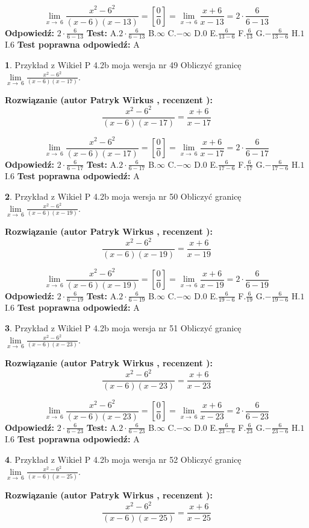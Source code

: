 \documentclass[12pt, a4paper]{article}
\theoremstyle{definition} %
\newtheorem{zad}{}
\newcommand{\zadStart}[1]{\begin{zad}#1\newline}
\newcommand{\zadStop}{\end{zad}}
\newcommand{\rozwStart}[2]{\noindent \textbf{Rozwiązanie (autor #1 , recenzent #2): }\newline}
\newcommand{\rozwStop}{\newline}
\newcommand{\odpStart}{\noindent \textbf{Odpowiedź:}\newline}
\newcommand{\odpStop}{\newline}
\newcommand{\testStart}{\noindent \textbf{Test:}\newline}
\newcommand{\testStop}{\newline}
\newcommand{\kluczStart}{\noindent \textbf{Test poprawna odpowiedź:}\newline}
\newcommand{\kluczStop}{\newline}
\begin{document}
$$\lim\limits_{x\to\ 6}\frac{x^{2}-6^{2}}{(x-6)(x-13)}=[\frac{0}{0}]=\lim\limits_{x\to\ 6}\frac{x+6}{x-13}=2 \cdot \frac{6}{6-13}$$
\rozwStop
\odpStart
$2 \cdot \frac{6}{6-13}$
\odpStop
\testStart
A.$2 \cdot \frac{6}{6-13}$
B.$\infty$
C.$-\infty$
D.$0$
E.$\frac{6}{13-6}$
F.$\frac{6}{13}$
G.$-\frac{6}{13-6}$
H.$1$
I.$6$
\testStop
\kluczStart
A
\kluczStop



\zadStart{Przykład z Wikieł P 4.2b moja wersja nr 49}
Obliczyć granicę $\lim\limits_{x\to\ 6}\frac{x^{2}-6^{2}}{(x-6)(x-17)}$.
\zadStop
\rozwStart{Patryk Wirkus}{}
$$\frac{x^{2}-6^{2}}{(x-6)(x-17)}=\frac{x+6}{x-17}$$

$$\lim\limits_{x\to\ 6}\frac{x^{2}-6^{2}}{(x-6)(x-17)}=[\frac{0}{0}]=\lim\limits_{x\to\ 6}\frac{x+6}{x-17}=2 \cdot \frac{6}{6-17}$$
\rozwStop
\odpStart
$2 \cdot \frac{6}{6-17}$
\odpStop
\testStart
A.$2 \cdot \frac{6}{6-17}$
B.$\infty$
C.$-\infty$
D.$0$
E.$\frac{6}{17-6}$
F.$\frac{6}{17}$
G.$-\frac{6}{17-6}$
H.$1$
I.$6$
\testStop
\kluczStart
A
\kluczStop



\zadStart{Przykład z Wikieł P 4.2b moja wersja nr 50}
Obliczyć granicę $\lim\limits_{x\to\ 6}\frac{x^{2}-6^{2}}{(x-6)(x-19)}$.
\zadStop
\rozwStart{Patryk Wirkus}{}
$$\frac{x^{2}-6^{2}}{(x-6)(x-19)}=\frac{x+6}{x-19}$$

$$\lim\limits_{x\to\ 6}\frac{x^{2}-6^{2}}{(x-6)(x-19)}=[\frac{0}{0}]=\lim\limits_{x\to\ 6}\frac{x+6}{x-19}=2 \cdot \frac{6}{6-19}$$
\rozwStop
\odpStart
$2 \cdot \frac{6}{6-19}$
\odpStop
\testStart
A.$2 \cdot \frac{6}{6-19}$
B.$\infty$
C.$-\infty$
D.$0$
E.$\frac{6}{19-6}$
F.$\frac{6}{19}$
G.$-\frac{6}{19-6}$
H.$1$
I.$6$
\testStop
\kluczStart
A
\kluczStop



\zadStart{Przykład z Wikieł P 4.2b moja wersja nr 51}
Obliczyć granicę $\lim\limits_{x\to\ 6}\frac{x^{2}-6^{2}}{(x-6)(x-23)}$.
\zadStop
\rozwStart{Patryk Wirkus}{}
$$\frac{x^{2}-6^{2}}{(x-6)(x-23)}=\frac{x+6}{x-23}$$

$$\lim\limits_{x\to\ 6}\frac{x^{2}-6^{2}}{(x-6)(x-23)}=[\frac{0}{0}]=\lim\limits_{x\to\ 6}\frac{x+6}{x-23}=2 \cdot \frac{6}{6-23}$$
\rozwStop
\odpStart
$2 \cdot \frac{6}{6-23}$
\odpStop
\testStart
A.$2 \cdot \frac{6}{6-23}$
B.$\infty$
C.$-\infty$
D.$0$
E.$\frac{6}{23-6}$
F.$\frac{6}{23}$
G.$-\frac{6}{23-6}$
H.$1$
I.$6$
\testStop
\kluczStart
A
\kluczStop



\zadStart{Przykład z Wikieł P 4.2b moja wersja nr 52}
Obliczyć granicę $\lim\limits_{x\to\ 6}\frac{x^{2}-6^{2}}{(x-6)(x-25)}$.
\zadStop
\rozwStart{Patryk Wirkus}{}
$$\frac{x^{2}-6^{2}}{(x-6)(x-25)}=\frac{x+6}{x-25}$$
\end{document}
